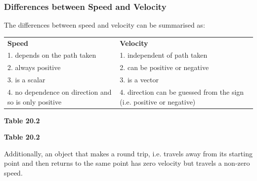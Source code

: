             \subsubsection{ Differences between Speed and Velocity}
            \nopagebreak
        \label{m38791*id66482}The differences between speed and velocity can be summarised as:\par 
          \begin{table}[H]
        \begin{center}
      \label{m38791*id66486}
    \noindent
      \tablelasttail{}
      \begin{xtabular}[t]{|l|l|}\hline
                  \textbf{Speed}
                 &
                  \textbf{Velocity}
     \tabularnewline{}
        1. depends on the path taken &
        1. independent of path taken%
     \tabularnewline{}
        2. always positive &
        2. can be positive or negative%
     \tabularnewline{}
        3. is a scalar &
        3. is a vector%
     \tabularnewline{}
        4. no dependence on direction and so is only positive &
        4. direction can be guessed from the sign (i.e. positive or negative)%
     \tabularnewline{}
    \end{xtabular}
      \end{center}
    \begin{center}{\small\bfseries Table 20.2}\end{center}
    \begin{caption}{\small\bfseries Table 20.2}\end{caption}
\end{table}
    \par
        \label{m38791*id66611}Additionally, an object that makes a round trip, i.e. travels away from its starting point and then returns to the same point has zero velocity but travels a non-zero speed.\par 
\label{m38791*secfhsst!!!underscore!!!id1252}
